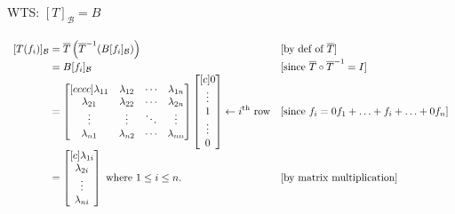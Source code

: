 \documentclass[12pt]{article}
\begin{document}
WTS: $[T]_\mathcal{B} = B$
\\\\
$\begin{array}{r@{}>{\displaystyle}ll}
		[T(f_i)]_\mathcal{B}                                         & {}= \overline{T}\left(\overline{T}^{-1}(B[f_i]_\mathcal{B})\right) & [\text{by def of }\overline{T}]                          \\
		                                                             & {}= B[f_i]_\mathcal{B}                                             & [\text{since } \overline{T} \circ \overline{T}^{-1} = I] \\
		                                                             & {}= \begin{bmatrix}[cccc]
			\lambda_{11} & \lambda_{12} & \cdots & \lambda_{1n} \\
			\lambda_{21} & \lambda_{22} & \cdots & \lambda_{2n} \\
			\vdots       & \vdots       & \ddots & \vdots       \\
			\lambda_{n1} & \lambda_{n2} & \cdots & \lambda_{nn} \\
		\end{bmatrix}
		\begin{bmatrix}[c]
			0      \\
			\vdots \\
			1      \\
			\vdots \\
			0
		\end{bmatrix} \leftarrow i^\text{th}\text{ row} & [\text{since } f_i = 0f_1 + \ldots + f_i + \ldots + 0f_n]                                                                     \\
		                                                             & {}=\begin{bmatrix}[c]
			\lambda_{1i} \\
			\lambda_{2i} \\
			\vdots       \\
			\lambda_{ni} \\
		\end{bmatrix} \text{ where } 1 \leq i \leq n.      & [\text{by matrix multiplication}]                        \\
	\end{array}$
\\\\\\
\end{document}
